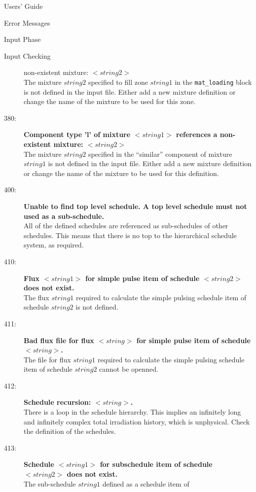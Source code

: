 \begin{chapter}{Users' Guide\label{app:user.guide}}
\begin{section}{Error Messages}
\begin{subsection}{Input Phase}
\begin{subsubsection}{Input Checking}
\begin{description}
{            non-existent mixture: $<\!\!string2\!\!>$}\ \\
          The mixture $string2$ specified to fill zone $string1$ in
          the \texttt{mat\_loading} block is not defined in the input
          file.  Either add a new mixture definition or change the
          name of the mixture to be used for this zone.
        \item[380:]\textbf{Component type 'l' of mixture
            $<\!\!string1\!\!>$ references a non-existent
            mixture: $<\!\!string2\!\!>$}\ \\
          The mixture $string2$ specified in the ``similar'' component
          of mixture $string1$ is not defined in the input file.
          Either add a new mixture definition or change the name of
          the mixture to be used for this definition.
        \item[400:]\textbf{Unable to find top level schedule.  A top
            level schedule must not used as a sub-schedule.}\ \\
          All of the defined schedules are referenced as sub-schedules
          of other schedules.  This means that there is no top to the
          hierarchical schedule system, as required.
        \item[410:]\textbf{Flux $<\!\!string1\!\!>$ for simple pulse
            item of schedule $<\!\!string2\!\!>$ does not exist.}\ \\
          The flux $string1$ required to calculate the simple pulsing
          schedule item of schedule $string2$ is not defined.
        \item[411:]\textbf{Bad flux file for flux $<\!\!string\!\!>$
            for simple pulse item of schedule $<\!\!string\!\!>$.}\ \\
          The file for flux $string1$ required to calculate the simple
          pulsing schedule item of schedule $string2$ cannot be openned.
        \item[412:]\textbf{Schedule recursion: $<\!\!string\!\!>$.}\ 
          \\
          There is a loop in the schedule hierarchy.  This implies an
          infinitely long and infinitely complex total irradiation
          history, which is unphysical.  Check the definition of the
          schedules.
        \item[413:]\textbf{Schedule $<\!\!string1\!\!>$ for subschedule
            item of schedule $<\!\!string2\!\!>$ does not exist.}\ \\
          The sub-schedule $string1$ defined as a schedule item of

\end{description}
\end{subsubsection}
\end{subsection}
\end{section}
\end{chapter}
